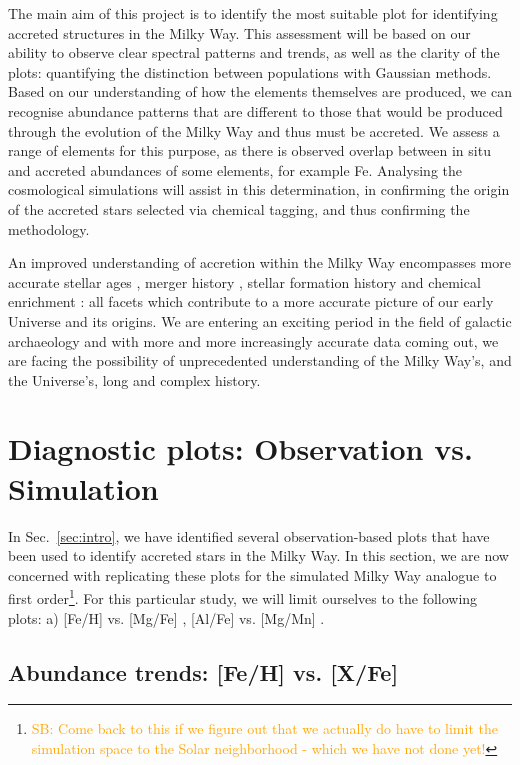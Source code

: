 \documentclass[fleqn,usenatbib]{mnras}
\newcommand{\SB}[1]{{\textcolor{orange}{SB: #1}}}
\begin{document}
The main aim of this project is to identify the most suitable plot for identifying accreted structures in the Milky Way. This assessment will be based on our ability to observe clear spectral patterns and trends, as well as the clarity of the plots: quantifying the distinction between populations with Gaussian methods. Based on our understanding of how the elements themselves are produced, we can recognise abundance patterns that are different to those that would be produced through the evolution of the Milky Way and thus must be accreted. We assess a range of elements for this purpose, as there is observed overlap between in situ and accreted abundances of some elements, for example Fe.  Analysing the cosmological simulations will assist in this determination, in confirming the origin of the accreted stars selected via chemical tagging, and thus confirming the methodology.

An improved understanding of accretion within the Milky Way encompasses more accurate stellar ages \citep{Das2020}, merger history \citep{Naidu2020}, stellar formation history and chemical enrichment \citep{DeSilva2015}: all facets which contribute to a more accurate picture of our early Universe and its origins. We are entering an exciting period in the field of galactic archaeology and with more and more increasingly accurate data coming out, we are facing the possibility of unprecedented understanding of the Milky Way’s, and the Universe’s, long and complex history.


\section{Diagnostic plots: Observation vs. Simulation}
\label{sec:comparison}

In Sec.~\ref{sec:intro}, we have identified several observation-based plots that have been used to identify accreted stars in the Milky Way. In this section, we are now concerned with replicating these plots for the simulated Milky Way analogue to first order\footnote{\SB{Come back to this if we figure out that we actually do have to limit the simulation space to the Solar neighborhood - which we have not done yet!}}. For this particular study, we will limit ourselves to the following plots: a) [Fe/H] vs. [Mg/Fe] \citep{Nissen2010}, [Al/Fe] vs. [Mg/Mn] \citep{Hawkins2015, Das2020}.

\subsection{Abundance trends: [Fe/H] vs. [X/Fe]} \label{sec:feh_xfe}
\end{document}
